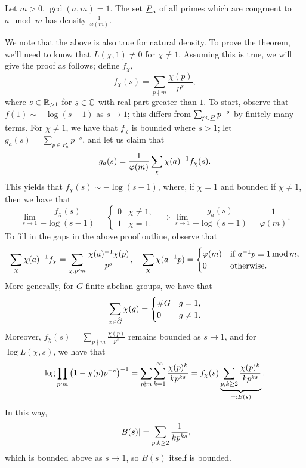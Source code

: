 \begin{theorem}
    Let $m > 0$, $\gcd(a, m) = 1$. The set $\underline P_a$ of all primes which are congruent to $a \mod m$ has density $\frac{1}{\varphi(m)}$.
\end{theorem}
\noindent We note that the above is also true for natural density. To prove the theorem, we'll need to know that $L(\chi, 1) \neq 0$ for $\chi \neq 1$. Assuming this is true, we will give the proof as follows; define $f_\chi$,
\[ f_\chi(s) = \sum_{p \nmid m} \frac{\chi(p)}{p^s}, \]
where $s \in \mathbb R_{>1}$ for $s \in \mathbb C$ with real part greater than $1$. To start, observe that $f(1) \sim -\log(s - 1)$ as $s \to 1$; this differs from $\sum_{p \in \underline P} p^{-s}$ by finitely many terms. For $\chi \neq 1$, we have that $f_\chi$ is bounded where $s > 1$; let $g_a(s) = \sum_{p \in P_a} p^{-s}$, and let us claim that
\[ g_a(s) = \frac{1}{\varphi(m)} \sum_\chi \chi(a)^{-1} f_\chi(s). \]
This yields that $f_\chi(s) \sim -\log(s-1)$, where, if $\chi = 1$ and bounded if $\chi \neq 1$, then we have that
\[ \lim_{s \to 1} \frac{f_\chi(s)}{-\log(s-1)} = \begin{cases} 0 & \chi \neq 1, \\ 1 & \chi = 1. \end{cases} \implies \lim_{s \to 1} \frac{g_a(s)}{-\log(s-1)} = \frac{1}{\varphi(m)}. \]
To fill in the gaps in the above proof outline, observe that
\[ \sum_\chi  \chi(a)^{-1} f_\chi = \sum_{\chi, p \nmid m} \frac{\chi(a)^{-1} \chi(p)}{p^s}, \quad \sum_{\chi} \chi(a ^{-1} p) = \begin{cases} \varphi(m) & \text{if } a^{-1} p \equiv 1 \operatorname{mod} m, \\ 0 & \text{otherwise}. \end{cases} \]
More generally, for $G$-finite abelian groups, we have that
\[ \sum_{x \in \widehat G} \chi(g) = \begin{cases} \# G & g = 1, \\ 0 & g \neq 1. \end{cases} \]
Moreover, $f_\chi(s) = \sum_{p \nmid m} \frac{\chi(p)}{p^s}$ remains bounded as $s \to 1$, and for $\log L(\chi, s)$, we have that
\[ \log \prod_{p \nmid m} \left(1 - \chi(p) p^{-s}\right)^{-1} = \sum_{p \nmid m} \sum_{k=1}^\infty \frac{\chi(p)^k}{k p^{ks}} = f_\chi(s) \underbrace{\sum_{p,k \geq 2} \frac{\chi(p)^k}{k p^{ks}}}_{=: B(s)}. \]
In this way,
\[ \left\lvert B(s) \right\rvert = \sum_{p,k \geq 2} \frac{1}{kp^{ks}}, \]
which is bounded above as $s \to 1$, so $B(s)$ itself is bounded.